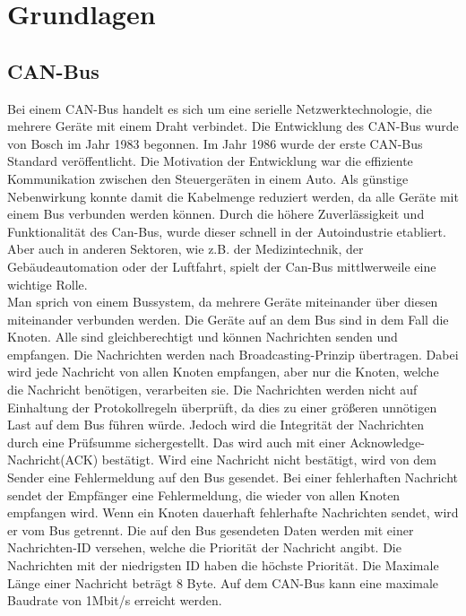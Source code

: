 \chapter{Grundlagen}


\section{CAN-Bus}
Bei einem CAN-Bus handelt es sich um eine serielle Netzwerktechnologie, 
die mehrere Geräte mit einem Draht verbindet.
Die Entwicklung des CAN-Bus wurde von Bosch im Jahr 1983 begonnen. Im Jahr 1986 wurde der erste CAN-Bus Standard 
veröffentlicht.
Die Motivation der Entwicklung war die effiziente Kommunikation zwischen den Steuergeräten in einem Auto. 
Als günstige
Nebenwirkung konnte damit die Kabelmenge reduziert werden, da alle Geräte mit einem Bus verbunden werden können.
Durch die höhere Zuverlässigkeit und Funktionalität des Can-Bus, wurde dieser schnell in der Autoindustrie etabliert.
Aber auch in anderen Sektoren, wie z.B. der Medizintechnik, der Gebäudeautomation oder der Luftfahrt, spielt der
Can-Bus mittlwerweile eine wichtige Rolle.
\cite[Seiten 2-10]{Voss2008}
\\
Man sprich von einem Bussystem, da mehrere Geräte miteinander über diesen miteinander verbunden werden. 
Die Geräte auf an dem Bus sind in dem Fall die Knoten. Alle sind gleichberechtigt und können Nachrichten senden und empfangen.
Die Nachrichten werden nach Broadcasting-Prinzip übertragen. Dabei wird jede Nachricht von allen Knoten empfangen, 
aber nur die Knoten, welche die Nachricht benötigen, verarbeiten sie. 
Die Nachrichten werden nicht auf Einhaltung der Protokollregeln 
überprüft, da dies zu einer größeren unnötigen Last auf dem Bus führen würde. 
Jedoch wird die Integrität der Nachrichten durch eine Prüfsumme sichergestellt. Das wird auch mit 
einer Acknowledge-Nachricht(ACK) bestätigt. Wird eine Nachricht nicht bestätigt, wird von dem Sender eine Fehlermeldung
auf den Bus gesendet.
Bei einer fehlerhaften Nachricht sendet der Empfänger eine Fehlermeldung, die wieder von allen Knoten empfangen wird.
Wenn ein Knoten dauerhaft fehlerhafte
Nachrichten sendet, wird er vom Bus getrennt. Die auf den Bus gesendeten Daten werden mit einer Nachrichten-ID
versehen, welche die Priorität der Nachricht angibt. Die Nachrichten mit der niedrigsten ID haben die höchste Priorität.
Die Maximale Länge einer Nachricht beträgt 8 Byte. 
Auf dem CAN-Bus kann eine maximale Baudrate von 1Mbit/s erreicht werden.
